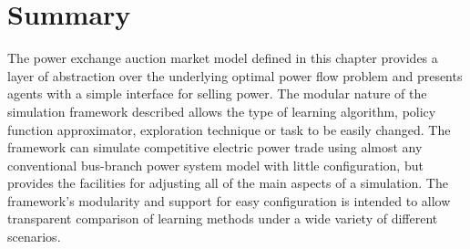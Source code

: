 %

\section{Summary}
The power exchange auction market model defined in this chapter provides a layer
of abstraction over the underlying optimal power flow problem and presents
agents with a simple interface for selling power.  The modular nature of the
simulation framework described allows the type of learning algorithm, policy
function approximator, exploration technique or task to be easily changed.  The
framework can simulate competitive electric power trade using almost any
conventional bus-branch power system model with little configuration, but
provides the facilities for adjusting all of the main aspects of a simulation.
The framework's modularity and support for easy configuration is intended to
allow transparent comparison of learning methods under a wide variety of
different scenarios.
